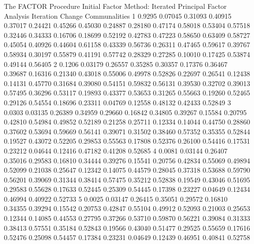 \documentclass{article}
\begin{document}
\begin{Woutput}
The FACTOR Procedure
Initial Factor Method: Iterated Principal Factor Analysis
Iteration  Change                                   Communalities
    1      0.9295  0.07045  0.31093  0.40915  0.37017  0.24421  0.45266  0.45030  0.24887  0.28180
                   0.47174  0.58018  0.53404  0.57518  0.32446  0.34333  0.16706  0.18699  0.52192
                   0.42783  0.47223  0.58650  0.63409  0.58727  0.45054  0.40926  0.44604  0.61158
                   0.43339  0.56736  0.26311  0.47465  0.59617  0.39767  0.58934  0.30197  0.55879
                   0.41191  0.57742  0.28329  0.27285  0.10010  0.17425  0.53874  0.49144  0.56405
    2      0.1206  0.03179  0.26557  0.35285  0.30357  0.17376  0.36467  0.39687  0.16316  0.21340
                   0.43018  0.55006  0.49978  0.52826  0.22697  0.26541  0.12438  0.14131  0.45770
                   0.31684  0.39080  0.54151  0.59832  0.56131  0.39530  0.32702  0.39013  0.57495
                   0.36296  0.53117  0.19893  0.43377  0.53653  0.31265  0.55663  0.19260  0.52465
                   0.29126  0.54554  0.18696  0.23311  0.04769  0.12558  0.48132  0.42433  0.52849
    3      0.0303  0.03135  0.26389  0.34959  0.29660  0.16842  0.34805  0.39267  0.15584  0.20795
                   0.42810  0.54984  0.49852  0.52189  0.21258  0.25711  0.12334  0.14044  0.44750
                   0.28860  0.37602  0.53694  0.59669  0.56141  0.39071  0.31502  0.38460  0.57352
                   0.35355  0.52844  0.19527  0.43072  0.52205  0.29853  0.55563  0.17808  0.52376
                   0.26100  0.54416  0.17531  0.23212  0.04644  0.12416  0.47182  0.41208  0.52685
    4      0.0081  0.03144  0.26407  0.35016  0.29583  0.16810  0.34444  0.39276  0.15541  0.20756
                   0.42834  0.55069  0.49894  0.52099  0.21038  0.25647  0.12342  0.14075  0.44579
                   0.28045  0.37318  0.53688  0.59790  0.56201  0.39069  0.31344  0.38414  0.57475
                   0.35212  0.52838  0.19549  0.43046  0.51695  0.29583  0.55628  0.17633  0.52445
                   0.25309  0.54445  0.17398  0.23227  0.04649  0.12434  0.46994  0.40922  0.52733
    5      0.0025  0.03147  0.26415  0.35051  0.29572  0.16810  0.34355  0.39294  0.15542  0.20753
                   0.42847  0.55104  0.49912  0.52093  0.21003  0.25653  0.12344  0.14085  0.44553
                   0.27795  0.37266  0.53710  0.59870  0.56221  0.39084  0.31333  0.38413  0.57551
                   0.35184  0.52843  0.19566  0.43040  0.51477  0.29525  0.55659  0.17616  0.52476
                   0.25098  0.54457  0.17384  0.23231  0.04649  0.12439  0.46951  0.40841  0.52758

\end{Woutput}
\end{document}
